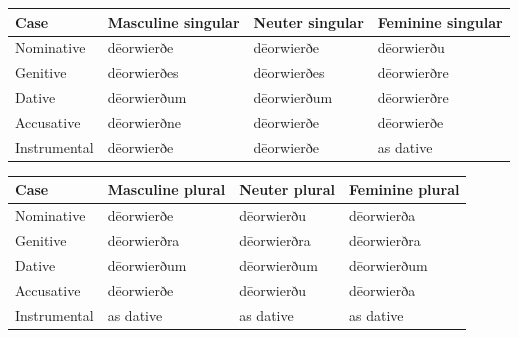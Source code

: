 \par\begingroup
\fontsize{10.5}{13.2}\selectfont
\setlength{\LTleft}{0pt}\setlength{\LTright}{\fill}
\noindent
\begin{tabular}{@{}>{\raggedright\arraybackslash}p{22.0mm}>{\raggedright\arraybackslash}p{31.188mm}>{\raggedright\arraybackslash}p{31.188mm}>{\raggedright\arraybackslash}p{31.188mm}@{}}
\toprule
\textbf{Case} & \textbf{Masculine singular} & \textbf{Neuter singular} & \textbf{Feminine singular} \\
\midrule
Nominative & dēorwierðe & dēorwierðe & dēorwierðu \\
Genitive & dēorwierðes & dēorwierðes & dēorwierðre \\
Dative & dēorwierðum & dēorwierðum & dēorwierðre \\
Accusative & dēorwierðne & dēorwierðe & dēorwierðe \\
Instrumental & dēorwierðe & dēorwierðe & as dative \\
\bottomrule
\end{tabular}
\par\endgroup
\par\addvspace{5pt}
\par\begingroup
\fontsize{10.5}{13.2}\selectfont
\setlength{\LTleft}{0pt}\setlength{\LTright}{\fill}
\noindent
\begin{tabular}{@{}>{\raggedright\arraybackslash}p{22.0mm}>{\raggedright\arraybackslash}p{31.188mm}>{\raggedright\arraybackslash}p{31.188mm}>{\raggedright\arraybackslash}p{31.188mm}@{}}
\toprule
\textbf{Case} & \textbf{Masculine plural} & \textbf{Neuter plural} & \textbf{Feminine plural} \\
\midrule
Nominative & dēorwierðe & dēorwierðu & dēorwierða \\
Genitive & dēorwierðra & dēorwierðra & dēorwierðra \\
Dative & dēorwierðum & dēorwierðum & dēorwierðum \\
Accusative & dēorwierðe & dēorwierðu & dēorwierða \\
Instrumental & as dative & as dative & as dative \\
\bottomrule
\end{tabular}
\par\endgroup

